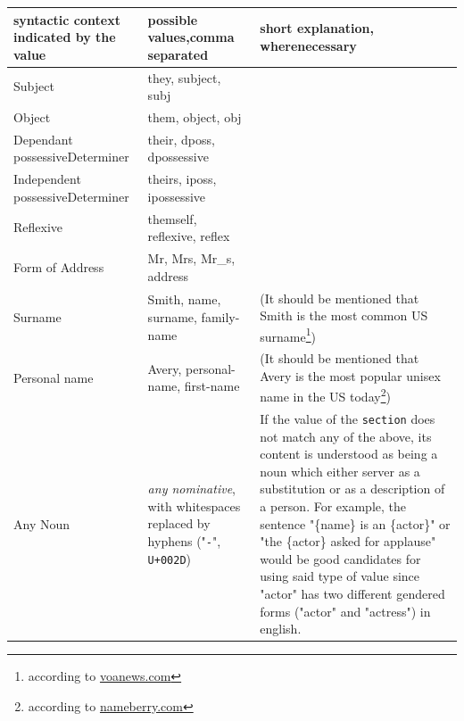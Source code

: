 \documentclass{article}
\begin{document}
    \begin{flushleft}
        \begin{center}
            \begin{longtable}{|p{7em} | p{9em} | p{14em} |}
                 \hline
                 {syntactic context indicated by the value} & {possible values,\linebreak comma separated} & {short explanation, where\linebreak necessary} \\
                 \hline\hline
                 Subject & they, subject, subj &  \\
                 \hline
                 Object & them, object, obj & \\
                 \hline
                 Dependant possessive\linebreak Determiner & their, dposs, dpossessive & \\
                 \hline
                 Independent possessive\linebreak Determiner & theirs, iposs, ipossessive & \\
                 \hline
                 Reflexive & themself, reflexive, reflex & \\
                 \hline
                 \hline
                 Form of Address & Mr, Mrs, Mr\_s, address & \\
                 \hline
                 Surname & Smith, name, surname, family-name & (It should be mentioned that Smith is the most common US surname\footnote{according to \href{https://www.voanews.com/usa/all-about-america/most-popular-last-name-each-us-state}{voanews.com}})\\
                 \hline
                 Personal name & Avery, personal-name, first-name & (It should be mentioned that Avery is the most popular unisex name in the US today\footnote{according to \href{https://nameberry.com/unisex-names}{nameberry.com}})\\
                 \hline
                 \hline
                 Any Noun & \emph{any nominative}, with whitespaces replaced by hyphens ("\texttt{-}", \texttt{U+002D}) & If the value of the \texttt{section} does not match any of the above, its content is understood as being a noun which either server as a substitution or as a description of a person.
                 For example, the sentence "\{name\} is an \{actor\}" or "the \{actor\} asked for applause" would be good candidates for using said type of value since "actor" has two different gendered forms ("actor" and "actress") in english. \\
                 \hline
            \end{longtable}
        \end{center}
    \end{flushleft}
\end{document}
